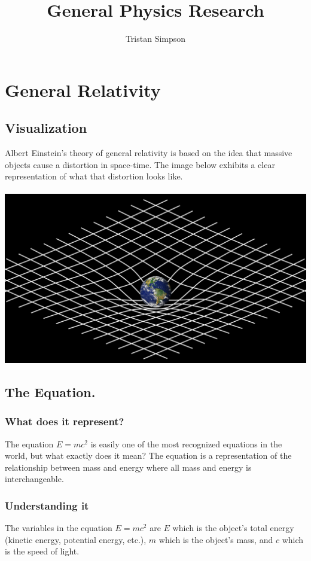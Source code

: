 \documentclass{article}
\title{General Physics Research}
\author{Tristan Simpson}
\begin{document}
\maketitle
\tableofcontents
\section{General Relativity}\label{sec:generalrelativity}
\subsection{Visualization}
Albert Einstein's theory of general relativity is based on the idea that massive objects cause a distortion in space-time. The image below exhibits a clear representation of what that distortion looks like.\\\\
\includegraphics[scale=0.30]{images/general_relativity.png}

\subsection{The Equation.}
\subsubsection{What does it represent?}
The equation $E = mc^2$ is easily one of the most recognized equations in the world, but what exactly does it mean? The equation is a representation of the relationship between mass and energy where all mass and energy is interchangeable.

\subsubsection{Understanding it}
The variables in the equation $E = mc^2$ are $E$ which is the object's total energy (kinetic energy, potential energy, etc.), $m$ which is the object's mass, and $c$ which is the speed of light.
\end{document}
